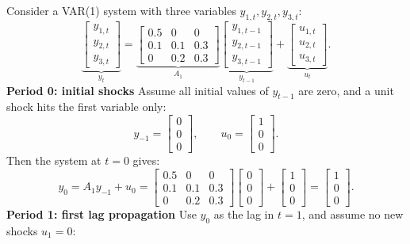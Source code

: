 \documentclass[a4paper, 12pt]{article}
\begin{document}
Consider a VAR(1) system with three variables $y_{1,t}, y_{2,t}, y_{3,t}$:
\[
\underbrace{
\begin{bmatrix}
y_{1,t} \\
y_{2,t} \\
y_{3,t}
\end{bmatrix}}_{y_t}
=
\underbrace{
\begin{bmatrix}
0.5 & 0 & 0 \\
0.1 & 0.1 & 0.3 \\
0 & 0.2 & 0.3
\end{bmatrix}}_{A_1}
\underbrace{
\begin{bmatrix}
y_{1,t-1} \\
y_{2,t-1} \\
y_{3,t-1}
\end{bmatrix}}_{y_{t-1}}
+
\underbrace{
\begin{bmatrix}
u_{1,t} \\
u_{2,t} \\
u_{3,t}
\end{bmatrix}}_{u_t}.
\]
\textbf{Period 0: initial shocks}  
Assume all initial values of $y_{t-1}$ are zero, and a unit shock hits the first variable only:
\[
y_{-1} = 
\begin{bmatrix}0 \\ 0 \\ 0\end{bmatrix}, 
\qquad
u_0 = 
\begin{bmatrix}1 \\ 0 \\ 0\end{bmatrix}.
\]
Then the system at $t=0$ gives:
\[
y_0 = A_1 y_{-1} + u_0
=
\begin{bmatrix}
0.5 & 0 & 0 \\
0.1 & 0.1 & 0.3 \\
0 & 0.2 & 0.3
\end{bmatrix}
\begin{bmatrix}0 \\ 0 \\ 0\end{bmatrix}
+
\begin{bmatrix}1 \\ 0 \\ 0\end{bmatrix}
=
\begin{bmatrix}1 \\ 0 \\ 0\end{bmatrix}.
\]
\textbf{Period 1: first lag propagation}  
Use $y_0$ as the lag in $t=1$, and assume no new shocks $u_1 = 0$:
\end{document}
